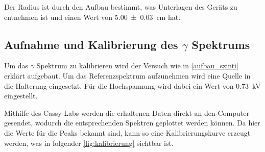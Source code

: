 \documentclass[12pt,english,ngerman]{scrartcl}
\begin{document}
Der Radius ist durch den Aufbau bestimmt, was Unterlagen des Geräts zu
entnehmen ist und einen Wert von \SI{5.00(3)}{\cm}
hat.\cite{zaehlrohrvorbereitung}

\begin{table}[H]
	\caption[Verzeichnete Zerfälle bei entsprechendem Magnetfeld]{
		Verzeichnete Zerfälle bei
		entsprechendem Magnetfeld bei einer Torzeit von \SI{100}{\second}.
		Dabei sind die Counts exakte Werte. \\
		\(B \dots\) Stärke des Magnetfelds in \si{\milli\tesla} mit einer
		Unsicherheit von \SI{0.2}{\milli\tesla}\\
		\(n \dots\) erhaltene bei erhaltene Anzahl an
		Zerfällen bei entsprechendem Magnetfeld}\label{tab:magnetspektrometer}
	\begin{center}
		
	\end{center}
\end{table}

\subsection{Aufnahme und Kalibrierung des \texorpdfstring{$\gamma$}{gamma}
	Spektrums}\label{sec:aufname_kalibrierungsspektrum}

Um das \(\gamma\) Spektrum zu kalibrieren wird der Versuch wie in
\autoref{aufbau_szinti} erklärt aufgebaut. Um das Referenzspektrum aufzunehmen
wird eine  Quelle in die Halterung eingesetzt. Für die
Hochspannung wird dabei ein Wert von \SI{0.73}{\kilo\volt} eingestellt.

Mithilfe des Cassy-Labs werden die erhaltenen Daten direkt an den Computer
gesendet, wodurch die entsprechenden Spektren geplottet werden können. Da hier
die Werte für die Peaks bekannt sind, kann so eine Kalibrierungskurve erzeugt
werden, was in folgender \autoref{fig:kalibrierung} sichtbar ist.
\end{document}
